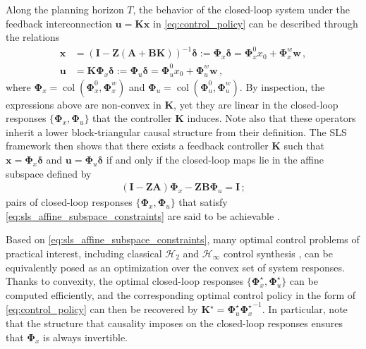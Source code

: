 \documentclass[conference]{IEEEtran}
\begin{document}
Along the planning horizon $T$, the behavior of the closed-loop system under the feedback interconnection $\mathbf{u} = \mathbf{K} \mathbf{x}$ in \eqref{eq:control_policy} can be described through the relations
    \begin{align}
        \mathbf{x} &= \left(\mathbf{I} - \mathbf{Z}\left(\mathbf{A} +  \mathbf{B}\mathbf{K}\right)\right)^{-1} \bm{\delta} := \bm{\Phi}_x \bm{\delta} = \bm{\Phi}_x^0 x_0 + \bm{\Phi}_x^w \mathbf{w}\,, \label{eq:closed_loop_behavior_x_K}\\
        \mathbf{u} &= \mathbf{K}\bm{\Phi}_x \bm{\delta} := \bm{\Phi}_u \bm{\delta} = \bm{\Phi}_u^0 x_0 + \bm{\Phi}_u^w \mathbf{w}\,, \label{eq:closed_loop_behavior_u_K}
    \end{align}
where $\bm{\Phi}_x = \operatorname{col}(\bm{\Phi}_x^0, \bm{\Phi}_x^w)$ and $\bm{\Phi}_u = \operatorname{col}(\bm{\Phi}_u^0, \bm{\Phi}_u^w)$. By inspection, the expressions above are non-convex in $\mathbf{K}$, yet they are linear in the closed-loop responses $\{\bm{\Phi}_x, \bm{\Phi}_u\}$ that the controller $\mathbf{K}$ induces. Note also that these operators inherit a lower block-triangular causal structure from their definition. The SLS framework then shows that there exists a feedback controller $\mathbf{K}$ such that $\mathbf{x} = \bm{\Phi}_x \bm{\delta}$ and $\mathbf{u} = \bm{\Phi}_u \bm{\delta}$ if and only if the closed-loop maps lie in the affine subspace defined by
\begin{align}
    \label{eq:sls_affine_subspace_constraints}
    (\mathbf{I} - \mathbf{Z} \mathbf{A}) \bm{\Phi}_x - \mathbf{Z} \mathbf{B} \bm{\Phi}_u = \mathbf{I}\,;
\end{align}
pairs of closed-loop responses $\{\bm{\Phi}_x, \bm{\Phi}_u\}$ that satisfy \eqref{eq:sls_affine_subspace_constraints} are said to be achievable \cite{wang2019system}.

Based on \eqref{eq:sls_affine_subspace_constraints}, many optimal control problems of practical interest, including classical $\mathcal{H}_2$ and $\mathcal{H}_\infty$ control synthesis \cite{hassibi1999indefinite}, can be equivalently posed as an optimization over the convex set of system responses.
Thanks to convexity, the optimal closed-loop responses $\{\bm{\Phi}^\star_x, \bm{\Phi}^\star_u\}$ can be computed efficiently, and the corresponding optimal control policy in the form of \eqref{eq:control_policy} can then be recovered by $\mathbf{K}^\star = \bm{\Phi}^\star_u{\bm{\Phi}^\star_x}^{-1}$. In particular, note that the structure that causality imposes on the closed-loop responses ensures that $\bm{\Phi}_x$ is always invertible.
\end{document}
